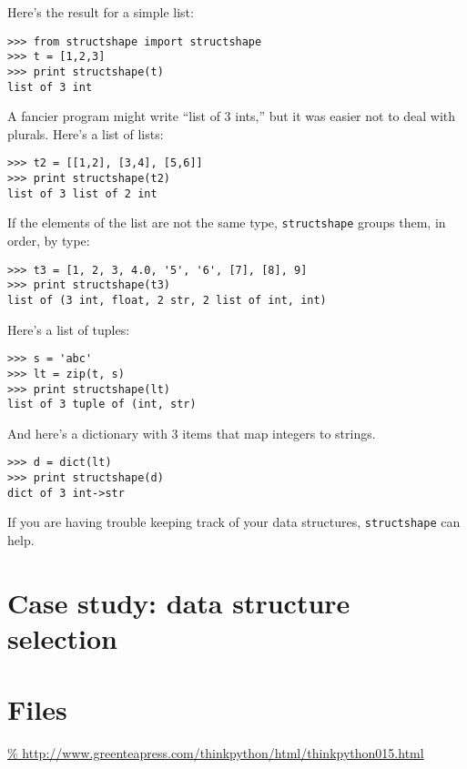 \documentclass{article}
\begin{document}
Here’s the result for a simple list:
\begin{verbatim}
>>> from structshape import structshape
>>> t = [1,2,3]
>>> print structshape(t)
list of 3 int
\end{verbatim}
A fancier program might write ``list of 3 ints,'' but it was easier not
to deal with plurals. Here’s a list of lists:
\begin{verbatim}
>>> t2 = [[1,2], [3,4], [5,6]]
>>> print structshape(t2)
list of 3 list of 2 int
\end{verbatim}
If the elements of the list are not the same type, \verb|structshape| groups
them, in order, by type:
\begin{verbatim}
>>> t3 = [1, 2, 3, 4.0, '5', '6', [7], [8], 9]
>>> print structshape(t3)
list of (3 int, float, 2 str, 2 list of int, int)
\end{verbatim}
Here's a list of tuples:
\begin{verbatim}
>>> s = 'abc'
>>> lt = zip(t, s)
>>> print structshape(lt)
list of 3 tuple of (int, str)
\end{verbatim}
And here's a dictionary with 3 items that map integers to strings.
\begin{verbatim}
>>> d = dict(lt)
>>> print structshape(d)
dict of 3 int->str
\end{verbatim}
If you are having trouble keeping track of your data structures,
\verb|structshape| can help.



\section{Case study: data structure selection}

\section{Files}
\url{%
http://www.greenteapress.com/thinkpython/html/thinkpython015.html}
\end{document}
